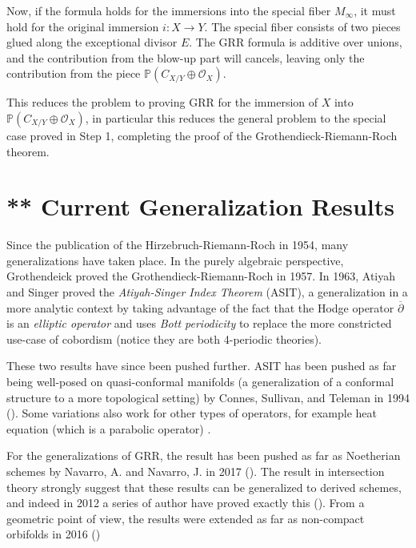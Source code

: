\documentclass{book}
\newenvironment{Proof}[1][]
  {\begin{ProofTcb}[#1]}
  {\end{ProofTcb}}
\renewcommand{\P}{{\mathbb{P}}}
\newcommand{\CO}{{\mathcal{O}}}
\begin{document}
\begin{Proof}
  Now, if the formula holds for the immersions into the special fiber $M_\infty$, it must hold for the original
  immersion $i: X \to Y$. The special fiber consists of two pieces glued along the exceptional divisor $E$. The
  GRR formula is additive over unions, and the contribution from the blow-up part will cancels, leaving only the
  contribution from the piece $\P(C_{X/Y} \oplus \CO_X)$.

  This reduces the problem to proving GRR for the immersion of $X$ into $\P(C_{X/Y} \oplus \CO_X)$, in
  particular this reduces the general problem to the special case proved in Step 1, completing the
  proof of the Grothendieck-Riemann-Roch theorem.
\end{Proof}


\section{** Current Generalization Results}\label{sec:DRR}

Since the publication of the Hirzebruch-Riemann-Roch in 1954, many generalizations have taken place. In the
purely algebraic perspective, Grothendeick proved the Grothendieck-Riemann-Roch in 1957. In 1963, Atiyah and
Singer proved the \emph{Atiyah-Singer Index Theorem} (ASIT), a generalization in a more analytic context by taking
advantage of the fact that the Hodge operator $\overline{\partial}$ is an \emph{elliptic operator} and uses
\emph{Bott periodicity} to replace the more constricted use-case of cobordism (notice they are both
4-periodic theories).

These two results have since been pushed further. ASIT has been pushed as far being well-posed on
quasi-conformal manifolds (a generalization of a conformal structure to a more topological setting) by
Connes, Sullivan, and Teleman in 1994 (\cite{connesQuasiconformalMappingsOperators1994}). Some variations
also work for other types of operators, for example heat equation (which is a parabolic operator)
\cite{gilkeyInvarianceTheoryHeat2018}.

For the generalizations of GRR, the result has been pushed as far as Noetherian schemes by Navarro, A. and
Navarro, J. in 2017 (\cite{navarroRiemannRochFormulaProjective2017}). The result in intersection theory
strongly suggest that these results can be generalized to derived schemes, and indeed in 2012 a series of
author have proved exactly this (\cite{lowreyGrothendieckRiemannRochDerivedSchemes2012}). From a geometric
point of view, the results were extended as far as non-compact orbifolds in 2016
(\cite{montpletRiemannRochIsometriesNoncompact2016})
\end{document}
